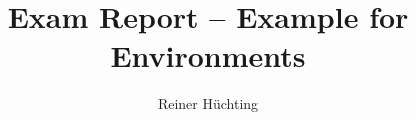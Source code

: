 \documentclass[a4paper]{scrartcl}
\begin{document}
    \title{Exam Report -- Example for Environments}
    \author{Reiner Hüchting}

    \maketitle


    \insertexamreport
\end{document}
